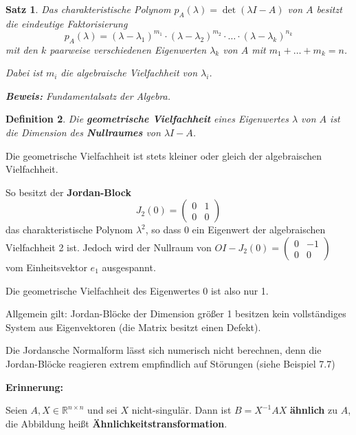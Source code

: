 \documentclass[%
a4paper,
11pt,		%
leqno,		%
]
{scrartcl}
\theoremstyle{plain}
\newtheorem{mydef}{Definition}[section]
\theoremstyle{plain}
\newtheorem{mysatz}[mydef]{Satz}
\begin{document}
\begin{mysatz}
Das charakteristische Polynom $p_A(\lambda) = \det(\lambda I - A)$ von $A$ besitzt die eindeutige Faktorisierung
\[
p_A(\lambda) = (\lambda - \lambda_1)^{m_1} \cdot (\lambda - \lambda_2)^{m_2} \cdot \ldots \cdot (\lambda - \lambda_k)^{n_k}
\]
mit den $k$ paarweise verschiedenen Eigenwerten $\lambda_k$ von $A$ mit $m_1 + \ldots + m_k = n$.

Dabei ist $m_i$ die algebraische Vielfachheit von $\lambda_i$.\newline

\textbf{Beweis:} Fundamentalsatz der Algebra.
\end{mysatz}

\begin{mydef}
  Die \textbf{geometrische Vielfachheit} eines Eigenwertes $\lambda$ von $A$ ist die Dimension des \textbf{Nullraumes} von $\lambda I -A$.
\end{mydef}


Die geometrische Vielfachheit ist stets kleiner oder gleich der algebraischen Vielfachheit.

So besitzt der \textbf{Jordan-Block}
\[
J_2(0) = 
\begin{pmatrix}
0 & 1\\
0 & 0
\end{pmatrix}
\]
das charakteristische Polynom $\lambda^2$, so dass 0 ein Eigenwert der algebraischen Vielfachheit 2 ist. Jedoch wird der Nullraum von $OI - J_2(0) = \begin{pmatrix}
0 & -1\\
0 & 0
\end{pmatrix}$
vom Einheitsvektor $e_1$ ausgespannt.

Die geometrische Vielfachheit des Eigenwertes 0 ist also nur 1.

Allgemein gilt: Jordan-Blöcke der Dimension größer 1 besitzen kein vollständiges System aus Eigenvektoren (die Matrix besitzt einen Defekt).

Die Jordansche Normalform lässt sich numerisch nicht berechnen, denn die Jordan-Blöcke reagieren extrem empfindlich auf Störungen (siehe Beispiel 7.7) %

\textbf{Erinnerung:}

Seien $A,X \in \mathbb{R}^{n \times n}$ und sei $X$ nicht-singulär. Dann ist $B=X^{-1}AX$ \textbf{ähnlich} zu $A$, die Abbildung heißt \textbf{Ähnlichkeitstransformation}.
\end{document}

